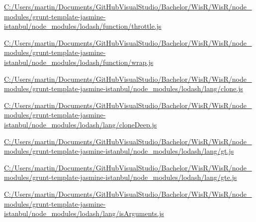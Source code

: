 \begin{DoxyCompactItemize}
\item 
\hyperlink{_c_1_2_users_2martin_2_documents_2_git_hub_visual_studio_2_bachelor_2_wis_r_2_wis_r_2node_module6205807321d733b643c3a4cee4c84949}{C\+:/\+Users/martin/\+Documents/\+Git\+Hub\+Visual\+Studio/\+Bachelor/\+Wis\+R/\+Wis\+R/node\+\_\+modules/grunt-\/template-\/jasmine-\/istanbul/node\+\_\+modules/lodash/function/throttle.\+js}
\item 
\hyperlink{_c_1_2_users_2martin_2_documents_2_git_hub_visual_studio_2_bachelor_2_wis_r_2_wis_r_2node_module68a061d7381898f8fcfb5d97c2323ccc}{C\+:/\+Users/martin/\+Documents/\+Git\+Hub\+Visual\+Studio/\+Bachelor/\+Wis\+R/\+Wis\+R/node\+\_\+modules/grunt-\/template-\/jasmine-\/istanbul/node\+\_\+modules/lodash/function/wrap.\+js}
\item 
\hyperlink{_c_1_2_users_2martin_2_documents_2_git_hub_visual_studio_2_bachelor_2_wis_r_2_wis_r_2node_moduleeb1fe6fa6c6d2ecefd67488f4d6bb3ed}{C\+:/\+Users/martin/\+Documents/\+Git\+Hub\+Visual\+Studio/\+Bachelor/\+Wis\+R/\+Wis\+R/node\+\_\+modules/grunt-\/template-\/jasmine-\/istanbul/node\+\_\+modules/lodash/lang/clone.\+js}
\item 
\hyperlink{_c_1_2_users_2martin_2_documents_2_git_hub_visual_studio_2_bachelor_2_wis_r_2_wis_r_2node_module094e620347afd2cbd621d7e2eec4c069}{C\+:/\+Users/martin/\+Documents/\+Git\+Hub\+Visual\+Studio/\+Bachelor/\+Wis\+R/\+Wis\+R/node\+\_\+modules/grunt-\/template-\/jasmine-\/istanbul/node\+\_\+modules/lodash/lang/clone\+Deep.\+js}
\item 
\hyperlink{_c_1_2_users_2martin_2_documents_2_git_hub_visual_studio_2_bachelor_2_wis_r_2_wis_r_2node_modulebf62746afda1021b31e3c5271fc2e551}{C\+:/\+Users/martin/\+Documents/\+Git\+Hub\+Visual\+Studio/\+Bachelor/\+Wis\+R/\+Wis\+R/node\+\_\+modules/grunt-\/template-\/jasmine-\/istanbul/node\+\_\+modules/lodash/lang/gt.\+js}
\item 
\hyperlink{_c_1_2_users_2martin_2_documents_2_git_hub_visual_studio_2_bachelor_2_wis_r_2_wis_r_2node_module32bc4c264b48af0541fdf1442b622704}{C\+:/\+Users/martin/\+Documents/\+Git\+Hub\+Visual\+Studio/\+Bachelor/\+Wis\+R/\+Wis\+R/node\+\_\+modules/grunt-\/template-\/jasmine-\/istanbul/node\+\_\+modules/lodash/lang/gte.\+js}
\item 
\hyperlink{_c_1_2_users_2martin_2_documents_2_git_hub_visual_studio_2_bachelor_2_wis_r_2_wis_r_2node_module2709c268c9e8d5f946eb7f09d2d9877b}{C\+:/\+Users/martin/\+Documents/\+Git\+Hub\+Visual\+Studio/\+Bachelor/\+Wis\+R/\+Wis\+R/node\+\_\+modules/grunt-\/template-\/jasmine-\/istanbul/node\+\_\+modules/lodash/lang/is\+Arguments.\+js}

\end{DoxyCompactItemize}
